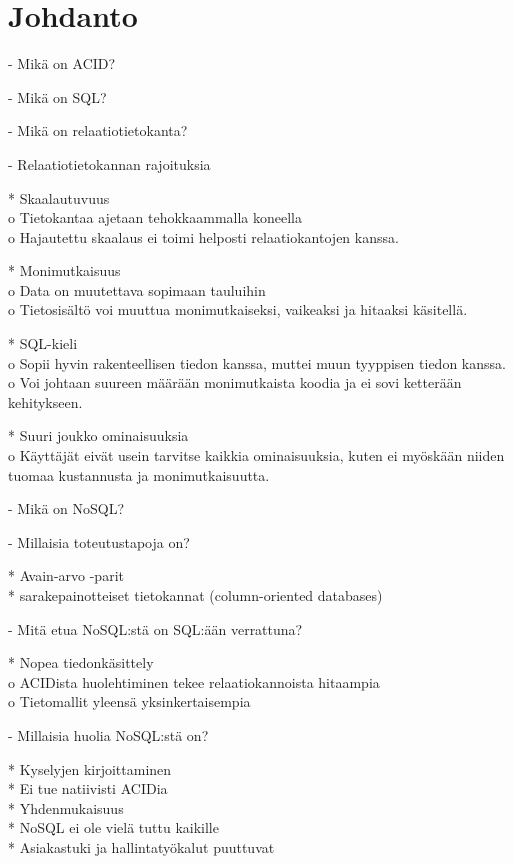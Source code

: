 \section{Johdanto}

- Mikä on ACID?

- Mikä on SQL?

- Mikä on relaatiotietokanta?

- Relaatiotietokannan rajoituksia

* Skaalautuvuus\\
o Tietokantaa ajetaan tehokkaammalla koneella\\
o Hajautettu skaalaus ei toimi helposti relaatiokantojen kanssa.

* Monimutkaisuus\\
o Data on muutettava sopimaan tauluihin\\
o Tietosisältö voi muuttua monimutkaiseksi, vaikeaksi ja hitaaksi käsitellä.

* SQL-kieli\\
o Sopii hyvin rakenteellisen tiedon kanssa, muttei muun tyyppisen tiedon kanssa.\\
o Voi johtaan suureen määrään monimutkaista koodia ja ei sovi ketterään kehitykseen.

* Suuri joukko ominaisuuksia\\
o Käyttäjät eivät usein tarvitse kaikkia ominaisuuksia, kuten ei myöskään niiden tuomaa kustannusta ja monimutkaisuutta.

- Mikä on NoSQL?

- Millaisia toteutustapoja on?

* Avain-arvo -parit\\
* sarakepainotteiset tietokannat (column-oriented databases)

- Mitä etua NoSQL:stä on SQL:ään verrattuna?

* Nopea tiedonkäsittely\\
o ACIDista huolehtiminen tekee relaatiokannoista hitaampia\\
o Tietomallit yleensä yksinkertaisempia

- Millaisia huolia NoSQL:stä on?

* Kyselyjen kirjoittaminen\\
* Ei tue natiivisti ACIDia\\
* Yhdenmukaisuus\\
* NoSQL ei ole vielä tuttu kaikille\\
* Asiakastuki ja hallintatyökalut puuttuvat
